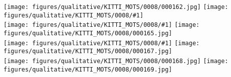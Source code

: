 \documentclass[10pt,twocolumn,letterpaper]{article}
\begin{document}
\newcommand{\imgkittic}[1] {\texttt{[image: figures/qualitative/KITTI\_MOTS/0008/\#1]}}  
\begin{figure*}[t!]
	\centering
\texttt{[image: figures/qualitative/KITTI\_MOTS/0008/000162.jpg]}
		\vspace{1.2pt}
		\imgkittic{000163.jpg}
		\\
		
		\imgkittic{000164.jpg}		
		\vspace{1.2pt}
\texttt{[image: figures/qualitative/KITTI\_MOTS/0008/000165.jpg]}
		\\
		
		\imgkittic{000166.jpg}
		\vspace{1.2pt}
\texttt{[image: figures/qualitative/KITTI\_MOTS/0008/000167.jpg]}
	    \\
	    
	    \texttt{[image: figures/qualitative/KITTI\_MOTS/0008/000168.jpg]}
   		\vspace{1.2pt}
   		\texttt{[image: figures/qualitative/KITTI\_MOTS/0008/000169.jpg]}
\vspace{-6pt}\caption{\textbf{Qualitative Results on KITTI MOTS.} In a rare failure case, pylons are confused for pedestrians (highlighted by red ellipses). In most cases, detections correspond to real instances of the class.
	}
	\label{fig:kitti-results3}
\end{figure*}
\end{document}
